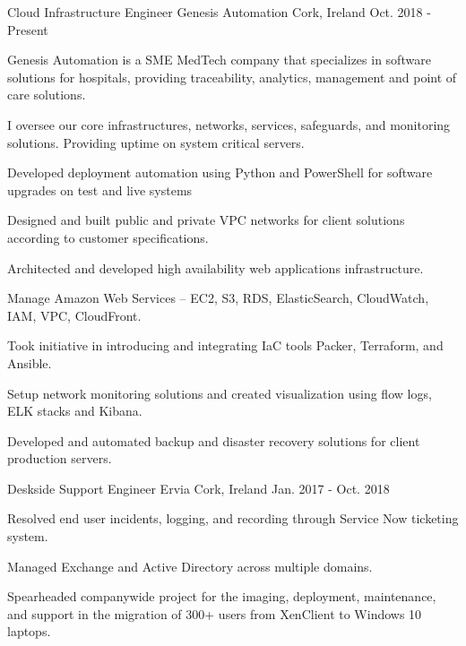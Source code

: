 


\begin{cventries}

\cventry
{Cloud Infrastructure Engineer}
{Genesis Automation}
{Cork, Ireland}
{Oct. 2018 - Present}
{
\begin{cvitems}
\item {Genesis Automation is a SME MedTech company that specializes in software solutions for hospitals, providing traceability, analytics, management and point of care solutions.}
\item {I oversee our core infrastructures, networks, services, safeguards, and monitoring solutions. Providing uptime on system critical servers.}
\item {Developed deployment automation using Python and PowerShell for software upgrades on test and live systems}
\item {Designed and built public and private VPC networks for client solutions according to customer specifications.}
\item {Architected and developed high availability web applications infrastructure.}
\item {Manage Amazon Web Services – EC2, S3, RDS, ElasticSearch, CloudWatch, IAM, VPC, CloudFront.}
\item {Took initiative in introducing and integrating IaC tools Packer, Terraform, and Ansible.}
\item {Setup network monitoring solutions and created visualization using flow logs, ELK stacks and Kibana.}
\item {Developed and automated backup and disaster recovery solutions for client production servers.}
\end{cvitems}
}


\cventry
{Deskside Support Engineer} %
{Ervia} %
{Cork, Ireland} %
{Jan. 2017 - Oct. 2018} %
{ %
\begin{cvitems}
\item {Resolved end user incidents, logging, and recording through Service Now ticketing system.}
\item {Managed Exchange and Active Directory across multiple domains.}
\item {Spearheaded companywide project for the imaging, deployment, maintenance, and support in the migration of 300+ users from XenClient to Windows 10 laptops.}
\end{cvitems}
}


\end{cventries}
